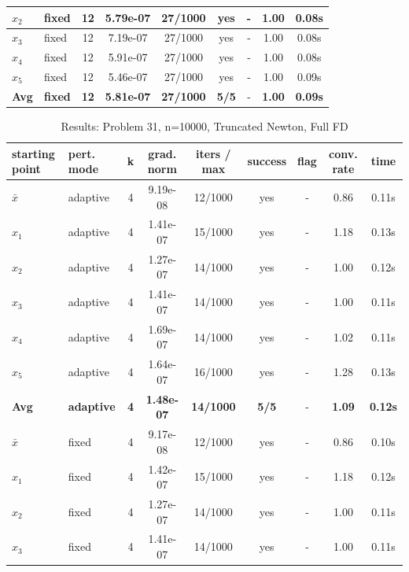 \begin{longtable}{|l|l|c|c|c|c|c|c|c|}
\hline
$x_2$ & fixed & 12 & 5.79e-07 & 27/1000 & yes & - & 1.00 & 0.08s \\
\hline
$x_3$ & fixed & 12 & 7.19e-07 & 27/1000 & yes & - & 1.00 & 0.08s \\
\hline
$x_4$ & fixed & 12 & 5.91e-07 & 27/1000 & yes & - & 1.00 & 0.08s \\
\hline
$x_5$ & fixed & 12 & 5.46e-07 & 27/1000 & yes & - & 1.00 & 0.09s \\
\hline
\hline\hline
\textbf{Avg} & \textbf{fixed} & \textbf{12} & \textbf{5.81e-07} & \textbf{27/1000} & \textbf{5/5} & - & \textbf{1.00} & \textbf{0.09s} \\
\hline\hline
\end{longtable}


\begin{longtable}{|l|l|c|c|c|c|c|c|c|}
\caption{Results: Problem 31, n=10000, Truncated Newton, Full FD} \\
\hline
\textbf{starting point} & \textbf{pert. mode} & \textbf{k} & \textbf{grad. norm} & \textbf{iters / max} & \textbf{success} & \textbf{flag} & \textbf{conv. rate} & \textbf{time} \\
\hline
\endfirsthead
\endhead
\endfoot
\hline
\endlastfoot
$\bar{x}$ & adaptive & 4 & 9.19e-08 & 12/1000 & yes & - & 0.86 & 0.11s \\
\hline
$x_1$ & adaptive & 4 & 1.41e-07 & 15/1000 & yes & - & 1.18 & 0.13s \\
\hline
$x_2$ & adaptive & 4 & 1.27e-07 & 14/1000 & yes & - & 1.00 & 0.12s \\
\hline
$x_3$ & adaptive & 4 & 1.41e-07 & 14/1000 & yes & - & 1.00 & 0.11s \\
\hline
$x_4$ & adaptive & 4 & 1.69e-07 & 14/1000 & yes & - & 1.02 & 0.11s \\
\hline
$x_5$ & adaptive & 4 & 1.64e-07 & 16/1000 & yes & - & 1.28 & 0.13s \\
\hline
\hline\hline
\textbf{Avg} & \textbf{adaptive} & \textbf{4} & \textbf{1.48e-07} & \textbf{14/1000} & \textbf{5/5} & - & \textbf{1.09} & \textbf{0.12s} \\
\hline\hline
\hline
$\bar{x}$ & fixed & 4 & 9.17e-08 & 12/1000 & yes & - & 0.86 & 0.10s \\
\hline
$x_1$ & fixed & 4 & 1.42e-07 & 15/1000 & yes & - & 1.18 & 0.12s \\
\hline
$x_2$ & fixed & 4 & 1.27e-07 & 14/1000 & yes & - & 1.00 & 0.11s \\
\hline
$x_3$ & fixed & 4 & 1.41e-07 & 14/1000 & yes & - & 1.00 & 0.11s \\

\end{longtable}
